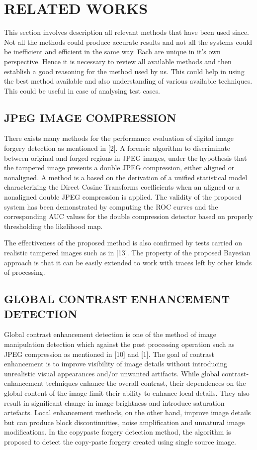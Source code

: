 \chapter{RELATED WORKS} %
This section involves description all relevant methods that have been used since. Not all the methods could produce accurate results and not all the systems could be inefficient and efficient in the same way. Each are unique in it's own perspective. Hence it is necessary to review all available methods and then establish a good reasoning for the method used by us. This could help in using the best method available and also understanding of various available techniques. This could be useful in case of analysing test cases.
    
\bigskip
\section{JPEG IMAGE COMPRESSION}
There exists many methods for the performance evaluation of digital image forgery detection as mentioned in [2]. A forensic algorithm to discriminate between original and forged regions in JPEG images, under the hypothesis that the tampered image presents a double JPEG compression, either aligned or nonaligned. A method is a based on the derivation of a unified statistical model characterizing the Direct Cosine Transforms coefficients when an aligned or a nonaligned double JPEG compression is applied. The validity of the proposed system has been demonstrated by computing the ROC curves and the corresponding AUC values for the double compression detector based on properly thresholding the likelihood map. 
\newline

\bigskip
The effectiveness of the proposed method is also confirmed by tests carried on realistic tampered images such as in [13]. The property of the proposed Bayesian approach is that it can be easily extended to work with traces left by other kinds of processing.
\section{GLOBAL CONTRAST ENHANCEMENT DETECTION}
Global contrast enhancement detection is one of the method of image manipulation detection which against the post processing operation such as JPEG compression as mentioned in [10] and [1]. The goal of contrast enhancement is to improve visibility of image details without introducing unrealistic visual appearances and/or unwanted artifacts. While global contrast-enhancement techniques enhance the overall contrast, their dependences on the global content of the image limit their ability to enhance local details. They also result in significant change in image brightness and introduce saturation artefacts. Local enhancement methods, on the other hand, improve image details but can produce block discontinuities, noise amplification and unnatural image modifications. In the copypaste forgery detection method, the algorithm is proposed to detect the copy-paste forgery created using single source image.

